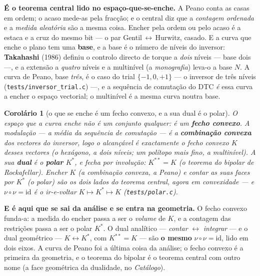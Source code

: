 \documentclass[11pt,a4paper]{article}
\newcommand{\code}[1]{\texttt{\small #1}}
\newtheorem{corolario}[teorema]{Corolário}
\begin{document}
\noindent \textbf{É o teorema central lido no espaço-que-se-enche.} A Peano conta as casas em ordem; o
acaso mede-as pela fracção; e o central diz que a \emph{contagem ordenada} e a \emph{medida aleatória}
são a mesma coisa. Encher pela ordem ou pelo acaso é a estaca e a cruz do mesmo bit --- o par
Gentil\,$\leftrightarrow$\,Hurwitz, casado. E a curva que enche o plano tem uma \textbf{base}, e a base
é o número de níveis do inversor: \textbf{Takahashi} (1986) definiu o controlo directo de torque a
\emph{dois} níveis --- base dois ---, e a extensão a \emph{quatro} níveis e a multinível (a
\emph{monografia}) leva-o a base $N$. A curva de Peano, base \emph{três}, é o caso do trial
$\{-1,0,+1\}$ --- o inversor de três níveis (\code{tests/inversor\_trial.c}) ---, e a sequência de
comutação do DTC \emph{é} essa curva a encher o espaço vectorial; o multinível é a mesma curva noutra
base.

\begin{corolario}[o que se enche é um fecho convexo, e a sua dual é o polar]\label{cor:convexo}
O espaço que a curva enche não é um conjunto qualquer: é um \textbf{fecho convexo}. A modulação --- a
\emph{média} da sequência de comutação --- é a \textbf{combinação convexa} dos vectores do inversor,
logo o alcançável é exactamente o fecho convexo $K$ desses vectores (o \emph{hexágono}, a dois níveis;
um polítopo mais fino, a multinível). A sua \textbf{dual} é o \textbf{polar} $K^{*}$, e fecha por
involução: $K^{**}=K$ (o teorema do bipolar de Rockafellar). \emph{Encher} $K$ (a combinação convexa, a
Peano) e \emph{contar} as suas faces por $K^{*}$ (o polar) são os dois lados do teorema central, agora
em convexidade --- e $\nu\circ\nu=\mathrm{id}$ é o ir-e-voltar $K\mapsto K^{*}\mapsto K$
(\code{tests/polar.c}).
\end{corolario}

\noindent \textbf{E é aqui que se sai da análise e se entra na geometria.} O fecho convexo funda-a: a
medida do encher passa a ser o \emph{volume} de $K$, e a contagem das restrições passa a ser o polar
$K^{*}$. O dual analítico --- \emph{contar} $\leftrightarrow$ \emph{integrar} --- e o dual geométrico
--- $K\leftrightarrow K^{*}$, com $K^{**}=K$ --- são \textbf{o mesmo} $\nu\circ\nu=\mathrm{id}$, lido em
dois eixos. A curva de Peano foi a última coisa da análise; o fecho convexo é a primeira da geometria,
e o teorema do bipolar é o teorema central com outro nome (a face geométrica da dualidade, no
\emph{Catálogo}).
\end{document}
